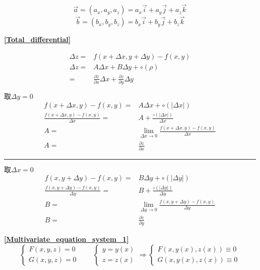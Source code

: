 \vline
\begin{minipage}{.4\textwidth}
	$$\overrightarrow{a}=(a_x,a_y,a_z)=a_x\overrightarrow{i}+a_y\overrightarrow{j}+a_z\overrightarrow{k}$$
	$$\overrightarrow{b}=(b_x,b_y,b_z)=b_x\overrightarrow{i}+b_y\overrightarrow{j}+b_z\overrightarrow{k}$$
\end{minipage}
\textbf{\large \ref{Total_differential}}\\
\begin{minipage}{.4\textwidth}
	\begin{align*}
		\varDelta z=&f(x+\varDelta x,y+\varDelta y)-f(x,y)\\
		\varDelta z=&A\varDelta x+B\varDelta y+\circ(\rho)\\
		=&\frac{\partial z}{\partial x}\varDelta x+\frac{\partial z}{\partial y}\varDelta y
	\end{align*}
\end{minipage}
\vline
\begin{minipage}{.6\textwidth}
	\centering
	$\mbox{取}\varDelta y =0$
	\begin{align*}
		f(x+\varDelta x,y)-f(x,y)=&A\varDelta x+\circ(|\varDelta x|)\\
		\frac{f(x+\varDelta x,y)-f(x,y)}{\varDelta x}=&A+\frac{\circ(|\varDelta x|)}{\varDelta x}\\
		A=&\lim\limits_{\varDelta x\to 0}\frac{f(x+\varDelta x,y)-f(x,y)}{\varDelta x}\\
		A=&\frac{\partial z}{\partial x}
	\end{align*}
	\noindent\rule{\textwidth}{0.4pt}
	$\mbox{取}\varDelta x =0$
	\begin{align*}
		f(x,y+\varDelta y)-f(x,y)=&B\varDelta y+\circ(|\varDelta y|)\\
		\frac{f(x,y+\varDelta y)-f(x,y)}{\varDelta y}=&B+\frac{\circ(|\varDelta y|)}{\varDelta y}\\
		B=&\lim\limits_{\varDelta y\to 0}\frac{f(x,y+\varDelta y)-f(x,y)}{\varDelta y}\\
		B=&\frac{\partial z}{\partial y}
	\end{align*}
\end{minipage}
\textbf{\large \ref{Multivariate_equation_system_1}}\\
$$\begin{cases}
	F(x,y,z)=0\\
	G(x,y,z)=0
\end{cases}\qquad\begin{cases}
	y=y(x)\\
	z=z(x)
\end{cases}\Rightarrow\begin{cases}
	F(x,y(x),z(x))\equiv0\\
	G(x,y(x),z(x))\equiv0
\end{cases}$$
